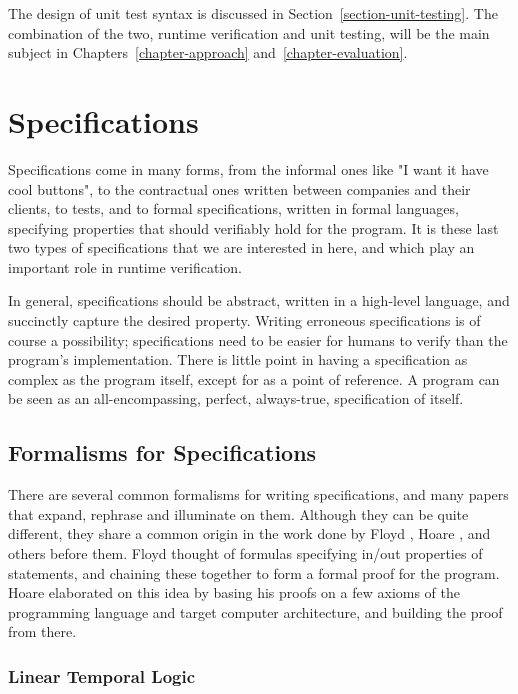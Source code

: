 \documentclass[a4paper,11pt]{kth-mag}
\begin{document}
The design of unit test syntax is discussed in
Section~\ref{section-unit-testing}. The combination of the two, runtime
verification and unit testing, will be the main subject in
Chapters~\ref{chapter-approach} and~\ref{chapter-evaluation}.


\section{Specifications} \label{section-specifications}

Specifications come in many forms, from the informal ones like "I want it have
cool buttons", to the contractual ones written between companies and their
clients, to tests, and to formal specifications, written in formal languages,
specifying properties that should verifiably hold for the program. It is these
last two types of specifications that we are interested in here, and which play
an important role in runtime verification.

In general, specifications should be abstract, written in a high-level
language, and succinctly capture the desired property. Writing erroneous
specifications is of course a possibility; specifications need to be easier for
humans to verify than the program's implementation. There is little point in
having a specification as complex as the program itself, except for as a point
of reference. A program can be seen as an all-encompassing, perfect,
always-true, specification of itself.


\subsection{Formalisms for Specifications}

There are several common formalisms for writing specifications, and many papers
that expand, rephrase and illuminate on them. Although they can be quite
different, they share a common origin in the work done by Floyd \cite{floyd67},
Hoare \cite{hoare69}, and others before them.  Floyd thought of formulas
specifying in/out properties of statements, and chaining these together to form
a formal proof for the program. Hoare elaborated on this idea by basing his
proofs on a few axioms of the programming language and target computer
architecture, and building the proof from there.


\subsubsection{Linear Temporal Logic}
\end{document}
